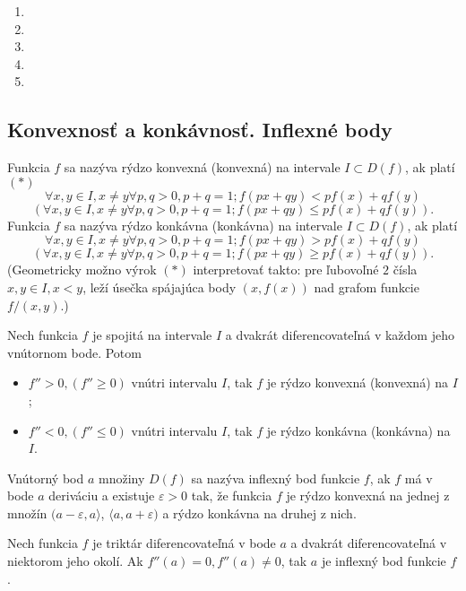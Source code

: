 \begin{enumerate}[resume]
	\item {}
	\item {}
	\item {}
	\item {}
	\item {}
\end{enumerate}

\subsection{Konvexnosť a konkávnosť. Inflexné body}
Funkcia $f$ sa nazýva rýdzo konvexná (konvexná) na intervale $I \subset D(f)$, ak platí $(*)$
$$\forall x,y\in I,x\neq y \forall p,q>0,p+q=1;f(px+qy)<pf(x)+qf(y)$$
$$(\forall x,y\in I,x\neq y \forall p,q>0,p+q=1;f(px+qy)\leq pf(x)+qf(y)).$$
Funkcia $f$ sa nazýva rýdzo konkávna (konkávna) na intervale $I \subset D(f)$, ak platí
$$\forall x,y\in I,x\neq y \forall p,q>0,p+q=1;f(px+qy)>pf(x)+qf(y)$$
$$(\forall x,y\in I,x\neq y \forall p,q>0,p+q=1;f(px+qy)\geq pf(x)+qf(y)).$$
(Geometricky možno výrok $(*)$ interpretovať takto: pre ľubovoľné $2$ čísla $x,y\in I,x<y$, leží úsečka spájajúca body $(x,f(x))$ nad grafom funkcie $f/(x,y)$.)

\begin{veta}
Nech funkcia $f$ je spojitá na intervale $I$ a dvakrát diferencovateľná v každom jeho vnútornom bode. Potom 
\begin{itemize}
\item $f''>0,(f''\geq 0)$ vnútri intervalu $I$, tak $f$ je rýdzo konvexná (konvexná) na $I$;
\item $f''<0,(f''\leq 0)$ vnútri intervalu $I$, tak $f$ je rýdzo konkávna (konkávna) na $I$.
\end{itemize}
Vnútorný bod $a$ množiny $D(f)$ sa nazýva inflexný bod funkcie $f$, ak $f$ má v bode $a$ deriváciu a existuje $\varepsilon >0$ tak, že funkcia $f$ je rýdzo konvexná na jednej z množín $(a-\varepsilon,a\rangle$, $\langle a,a+\varepsilon )$ a rýdzo konkávna na druhej z nich.
\end{veta}

\begin{veta}
Nech funkcia $f$ je triktár diferencovateľná v bode $a$ a dvakrát diferencovateľná v niektorom jeho okolí. Ak $f''(a)=0,f''(a)\neq 0$, tak $a$ je inflexný bod funkcie $f$.
\end{veta}

